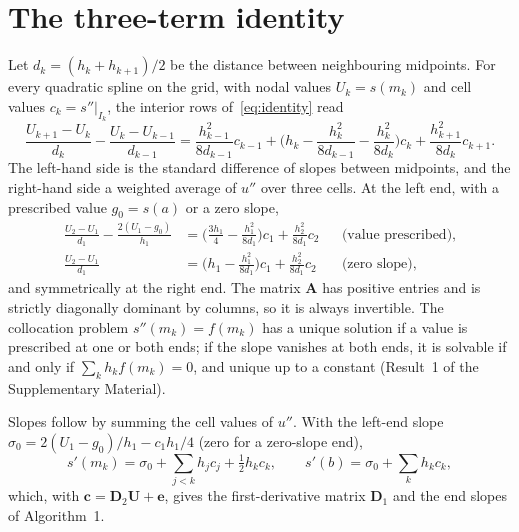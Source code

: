\appendix

\section{The three-term identity}\label{app:identity}
Let $d_k=(h_k+h_{k+1})/2$ be the distance between neighbouring midpoints. For every quadratic spline on the
grid, with nodal values $U_k=s(m_k)$ and cell values $c_k=s''|_{I_k}$, the interior rows of~\eqref{eq:identity}
read
\begin{equation}\label{eq:interior}
\frac{U_{k+1}-U_k}{d_k}-\frac{U_k-U_{k-1}}{d_{k-1}}
=\frac{h_{k-1}^2}{8d_{k-1}}c_{k-1}+\Big(h_k-\frac{h_k^2}{8d_{k-1}}-\frac{h_k^2}{8d_k}\Big)c_k+\frac{h_{k+1}^2}{8d_k}c_{k+1}.
\end{equation}
The left-hand side is the standard difference of slopes between midpoints, and the right-hand side a
weighted average of $u''$ over three cells. At the left end, with a prescribed value $g_0=s(a)$ or a zero
slope,
\begin{align}
\frac{U_2-U_1}{d_1}-\frac{2(U_1-g_0)}{h_1}&=\Big(\frac{3h_1}{4}-\frac{h_1^2}{8d_1}\Big)c_1+\frac{h_2^2}{8d_1}c_2 &&\text{(value prescribed)},\label{eq:dirrow}\\
\frac{U_2-U_1}{d_1}&=\Big(h_1-\frac{h_1^2}{8d_1}\Big)c_1+\frac{h_2^2}{8d_1}c_2 &&\text{(zero slope)},\label{eq:neurow}
\end{align}
and symmetrically at the right end. The matrix $\mathbf A$ has positive entries and is strictly diagonally dominant
by columns, so it is always invertible. The collocation problem $s''(m_k)=f(m_k)$ has a unique solution if a
value is prescribed at one or both ends; if the slope vanishes at both ends, it is solvable if and only if
$\sum_kh_kf(m_k)=0$, and unique up to a constant (Result~1 of the Supplementary Material).

Slopes follow by summing the cell values of $u''$. With the left-end slope
$\sigma_0=2(U_1-g_0)/h_1-c_1h_1/4$ (zero for a zero-slope end),
\begin{equation}\label{eq:D1}
s'(m_k)=\sigma_0+\sum_{j<k}h_jc_j+\tfrac12h_kc_k,\qquad s'(b)=\sigma_0+\sum_kh_kc_k,
\end{equation}
which, with $\mathbf c=\mathbf D_2\mathbf U+\mathbf e$, gives the first-derivative matrix $\mathbf D_1$ and the end slopes of Algorithm~1.

